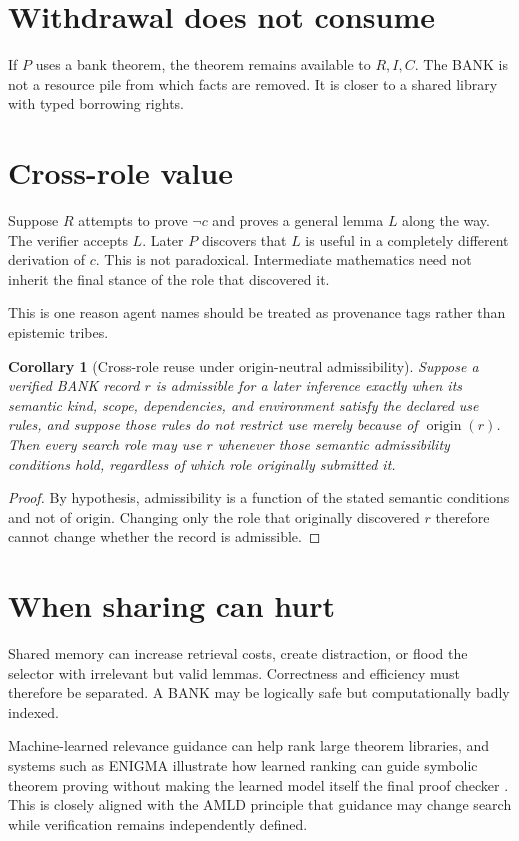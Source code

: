 \documentclass[11pt,openany]{book}
\newtheorem{corollary}[theorem]{Corollary}
\theoremstyle{definition}
\theoremstyle{remark}
\begin{document}
\section{Withdrawal does not consume}
If $P$ uses a bank theorem, the theorem remains available to $R,I,C$. The BANK is not a resource pile from which facts are removed. It is closer to a shared library with typed borrowing rights.

\section{Cross-role value}
Suppose $R$ attempts to prove $\neg c$ and proves a general lemma $L$ along the way. The verifier accepts $L$. Later $P$ discovers that $L$ is useful in a completely different derivation of $c$. This is not paradoxical. Intermediate mathematics need not inherit the final stance of the role that discovered it.

This is one reason agent names should be treated as provenance tags rather than epistemic tribes.

\begin{corollary}[Cross-role reuse under origin-neutral admissibility]\label{cor:crossreuse}
Suppose a verified BANK record $r$ is admissible for a later inference exactly when its semantic kind, scope, dependencies, and environment satisfy the declared use rules, and suppose those rules do not restrict use merely because of $\operatorname{origin}(r)$. Then every search role may use $r$ whenever those semantic admissibility conditions hold, regardless of which role originally submitted it.
\end{corollary}
\begin{proof}
By hypothesis, admissibility is a function of the stated semantic conditions and not of origin. Changing only the role that originally discovered $r$ therefore cannot change whether the record is admissible.
\end{proof}


\section{When sharing can hurt}
Shared memory can increase retrieval costs, create distraction, or flood the selector with irrelevant but valid lemmas. Correctness and efficiency must therefore be separated. A BANK may be logically safe but computationally badly indexed.

Machine-learned relevance guidance can help rank large theorem libraries, and systems such as ENIGMA illustrate how learned ranking can guide symbolic theorem proving without making the learned model itself the final proof checker \cite{ENIGMA2017}. This is closely aligned with the AMLD principle that guidance may change search while verification remains independently defined.
\end{document}
